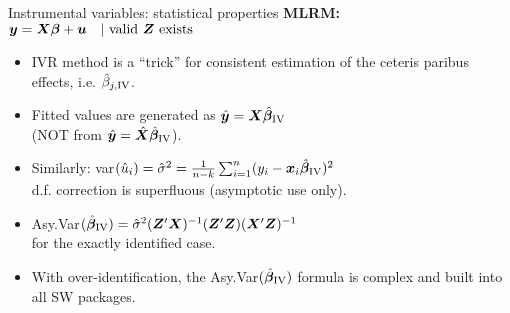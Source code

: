 \documentclass[usenames,dvipsnames]{beamer}
\begin{document}
\begin{frame}{Instrumental variables: statistical properties}
\textbf{MLRM:} $\bm{y} = \bm{X\beta} + \bm{u} \quad |\textnormal{~valid} ~\bm{Z} \textnormal{~exists}$
\medskip
\begin{itemize}
\item IVR method is a ``trick'' for consistent estimation of the ceteris paribus effects, i.e. $\hat{\beta}_{j,\textnormal{IV}}$.
\medskip
\item Fitted values are generated as $\hat{\bm{y}} = \bm{X} \hat{\bm{\beta}}_{\textnormal{IV}}$\\
(NOT from $\hat{\bm{y}} = \hat{\bm{X}} \hat{\bm{\beta}}_{\textnormal{IV}}$).
\medskip
\item Similarly: var$(\hat{u}_i) = \hat{\sigma}^2 = \frac{1}{n-k} \sum_{i=1}^n (y_i - \bm{x}_i \hat{\bm{\beta}}_{\textnormal{IV}})^2$\\d.f. correction is superfluous (asymptotic use only). 
\medskip
\item Asy.Var$(\hat{\bm{\beta}}_{\textnormal{IV}}) = \hat{\sigma}^2
(\bm{Z}^{\prime}\bm{X})^{-1}(\bm{Z}^{\prime}\bm{Z})(\bm{X}^{\prime}\bm{Z})^{-1}
$\\
for the exactly identified case.
\medskip
\item With over-identification, the Asy.Var$(\hat{\bm{\beta}}_{\textnormal{IV}})$ formula is complex and built into all SW packages.
\end{itemize}
\end{frame}
\end{document}
